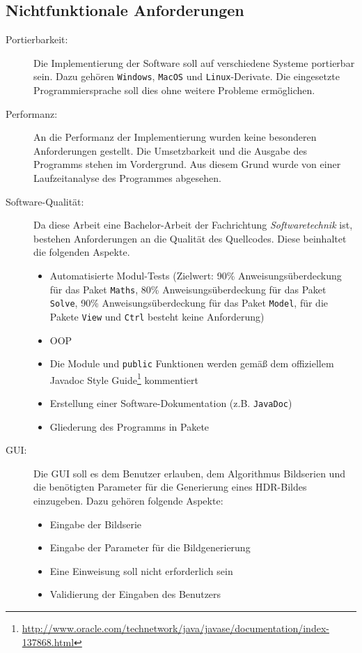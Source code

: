 \subsection{Nichtfunktionale Anforderungen}
\label{nfa}
\begin{description}
    \item[Portierbarkeit:] Die Implementierung der Software soll auf verschiedene Systeme portierbar sein. Dazu gehören \texttt{Windows}, \texttt{MacOS} und \texttt{Linux}-Derivate. Die eingesetzte Programmiersprache soll dies ohne weitere Probleme ermöglichen.
    
    \item[Performanz:] An die Performanz der Implementierung wurden keine besonderen Anforderungen gestellt. Die Umsetzbarkeit und die Ausgabe des Programms stehen im Vordergrund. Aus diesem Grund wurde von einer Laufzeitanalyse des Programmes abgesehen.
    
    \item[Software-Qualität:] Da diese Arbeit eine Bachelor-Arbeit der Fachrichtung \textit{Softwaretechnik} ist, bestehen Anforderungen an die Qualität des Quellcodes. Diese beinhaltet die folgenden Aspekte.
    \begin{itemize}
        \item Automatisierte Modul-Tests (Zielwert: 90\% Anweisungsüberdeckung für das Paket \texttt{Maths}, 80\% Anweisungsüberdeckung für das Paket \texttt{Solve}, 90\% Anweisungsüberdeckung für das Paket \texttt{Model}, für die Pakete \texttt{View} und \texttt{Ctrl} besteht keine Anforderung)
        \item \gls{OOP}
        \item Die Module und \texttt{public} Funktionen werden gemäß dem offiziellem Javadoc Style Guide\footnote{\url{http://www.oracle.com/technetwork/java/javase/documentation/index-137868.html}} kommentiert
        \item Erstellung einer Software-Dokumentation (z.B. \texttt{JavaDoc})
        \item Gliederung des Programms in Pakete
    \end{itemize}
    \item[\Gls{GUI}:] Die \gls{GUI} soll es dem Benutzer erlauben, dem Algorithmus Bildserien und die benötigten Parameter für die Generierung eines \gls{HDR}-Bildes einzugeben. Dazu gehören folgende Aspekte:
    \begin{itemize}
        \item Eingabe der Bildserie
        \item Eingabe der Parameter für die Bildgenerierung
        \item Eine Einweisung soll nicht erforderlich sein
        \item Validierung der Eingaben des Benutzers
    \end{itemize}


\end{description}

